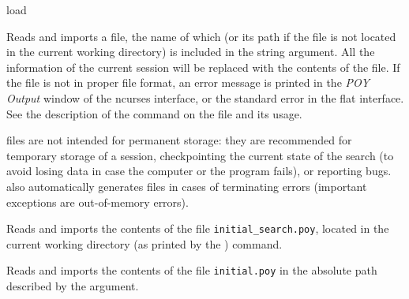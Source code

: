 \begin{command}{load}{}

	\syntax{\obligatory{(\poystring)}} 

	\begin{poydescription}
            Reads and imports a \poy file, the name of which (or its path if the file
            is not located in the current working directory) is included in the
            string argument.
            All the information of the current \poy session will be replaced
            with the contents of the \poy file. If the file is not in proper \poy file
            format, an error message is printed in the \emph{POY Output}
            window of the ncurses interface, or the standard error in the flat interface.
            See the description of the command  on the \poy file
            and its usage.

            \poy files are not intended for permanent storage: they are recommended
        for temporary storage of a \poy session, checkpointing
        the current state of the search (to avoid losing data in case the computer or the
        program fails), or reporting bugs. \poy also automatically
        generates \poy files in cases of terminating errors (important exceptions are
        out-of-memory errors).
	
	\end{poydescription}

    \begin{poyexamples}
            {Reads and imports the contents of the \poy file
            \texttt{initial\_search.poy}, located in the current working
            directory (as printed by the ) command.}

            {Reads and imports the contents of the \poy file \texttt{initial.poy}
             in the absolute path described by the argument.}
    \end{poyexamples}

    \begin{poyalso}
    \end{poyalso}

\end{command}

